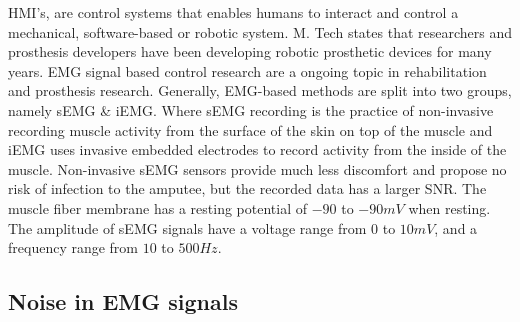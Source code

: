 \documentclass[../main.tex]{subfiles}
\begin{document}
\gls{HMI}'s, are control systems that enables humans to interact and control a mechanical, software-based or robotic system.
M. Tech \cite{Tech2015} states that researchers and prosthesis developers have been developing robotic prosthetic devices for many years.
\gls{EMG} signal based control research are a ongoing topic in rehabilitation and prosthesis research.
Generally, \gls{EMG}-based methods are split into two groups, namely \gls{sEMG} \& \gls{iEMG}.
Where \gls{sEMG} recording is the practice of non-invasive recording muscle activity from the surface of the skin on top of the muscle and \gls{iEMG} uses invasive embedded electrodes to record activity from the inside of the muscle.
Non-invasive \gls{sEMG} sensors provide much less discomfort and propose no risk of infection to the amputee, but the recorded data has a larger \gls{SNR}.
The muscle fiber membrane has a resting potential of $-90$ to $-90 mV$ when resting.
The amplitude of \gls{sEMG} signals have a voltage range from $0$ to $10 mV$, and a frequency range from $10$ to $500 Hz$.

\subsection{Noise in EMG signals}
\label{sec:noise}
\end{document}
